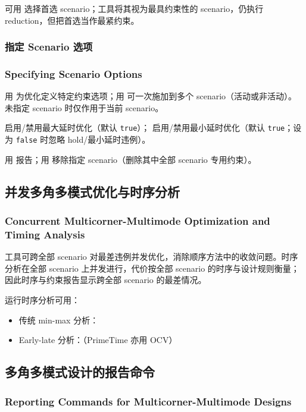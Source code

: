 可用  选择首选 scenario；工具将其视为最具约束性的 scenario，仍执行 reduction，但把首选当作最紧约束。

\subsubsection{指定 Scenario 选项}
\subsubsection*{Specifying Scenario Options}

用  为优化定义特定约束选项；用  可一次施加到多个 scenario（活动或非活动）。未指定 scenario 时仅作用于当前 scenario。

 启用/禁用最大延时优化（默认 \texttt{true}）； 启用/禁用最小延时优化（默认 \texttt{true}；设为 \texttt{false} 时忽略 hold/最小延时违例）。

用  报告；用  移除指定 scenario（删除其中全部 scenario 专用约束）。

\subsection{并发多角多模式优化与时序分析}
\subsubsection*{Concurrent Multicorner-Multimode Optimization and Timing Analysis}

工具可跨全部 scenario 对最差违例并发优化，消除顺序方法中的收敛问题。时序分析在全部 scenario 上并发进行，代价按全部 scenario 的时序与设计规则衡量；因此时序与约束报告显示跨全部 scenario 的最差情况。

运行时序分析可用：
\begin{itemize}
  \item 传统 min-max 分析：
  \item Early-late 分析：（PrimeTime 亦用 OCV）
\end{itemize}

\subsection{多角多模式设计的报告命令}
\subsubsection*{Reporting Commands for Multicorner-Multimode Designs}

